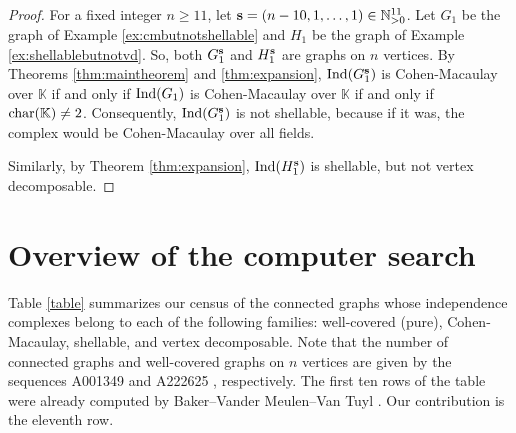 \documentclass[12pt]{amsart}
\theoremstyle{plain}
\theoremstyle{definition}
\theoremstyle{remark}
\numberwithin{equation}{section}
\numberwithin{equation}{section}
\begin{document}
\begin{proof}
    For a fixed integer $n \geq 11$, let ${\bf s} = (n-10,1,\dots,1) \in \mathbb{N}^{11}_{>0}$.  Let $G_1$ be the graph of Example \ref{ex:cmbutnotshellable} and
    $H_1$ be the graph of Example \ref{ex:shellablebutnotvd}.  So,
    both $G_1^{\bf s}$ and $H_1^{\bf s}$ are graphs on $n$ vertices.
    By Theorems \ref{thm:maintheorem} and \ref{thm:expansion}, 
    ${\rm Ind}(G_1^{\bf s})$ is Cohen-Macaulay over $\mathbb{K}$ if and only if
    ${\rm Ind}(G_1)$ is Cohen-Macaulay over $\mathbb{K}$ if and only if 
    ${\rm char}(\mathbb{K}) \neq 2$.  Consequently, 
    ${\rm Ind}(G_1^{\bf s})$ is not shellable, because if it was, 
    the complex would be Cohen-Macaulay over all fields.   

    Similarly, by Theorem \ref{thm:expansion}, ${\rm Ind}(H_1^{\bf s})$ is
    shellable, but not vertex decomposable.
\end{proof}

\section{Overview of the computer search}\label{sec:computations} 

Table \ref{table} summarizes our census of the connected graphs
whose independence complexes belong to each of the following families: 
well-covered (pure), Cohen-Macaulay, shellable, and vertex decomposable.
Note that the number of connected graphs
and well-covered graphs on $n$ vertices are given by the sequences
A001349 \cite{oeisA001349} and A222625
\cite{oeisA222625}, respectively.  The first ten rows of the table 
were already computed by Baker--Vander Meulen--Van Tuyl
\cite{BVMVT2018}.  Our contribution is the eleventh row.
\end{document}

